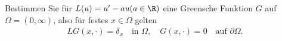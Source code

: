 
\begin{exercise}

Bestimmen Sie für $L(u) = u^{\prime} - au (a \in \R)$ eine Greensche Funktion
$G$ auf $\Omega = (0,\infty)$, also für festes $x \in \Omega$ gelten
\begin{align*}
  LG(x,\cdot) = \delta_x \quad \text{in } \Omega, \quad G(x,\cdot) = 0 \quad \text{auf } \partial\Omega.
\end{align*}

\end{exercise}


\begin{solution}

\phantom{}

\end{solution}

